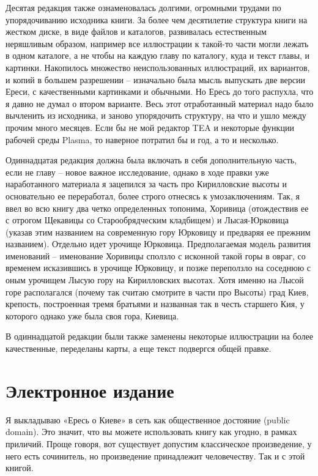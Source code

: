 Десятая редакция также ознаменовалась долгими, огромными трудами по упорядочиванию исходника книги. За более чем десятилетие структура книги на жестком диске, в виде файлов и каталогов, развивалась естественным неряшливым образом, например все иллюстрации к такой-то части могли лежать в одном каталоге, а не чтобы на каждую главу по каталогу, куда и текст главы, и картинки. Накопилось множество неиспользованных иллюстраций, их вариантов, и копий в большем разрешении – изначально была мысль выпускать две версии Ереси, с качественными картинками и обычными. Но Ересь до того распухла, что я давно не думал о втором варианте. Весь этот отработанный материал надо было вычленить из исходника, и заново упорядочить структуру, на что и ушло между прочим много месяцев. Если бы не мой редактор TEA и некоторые функции рабочей среды Plasma, то наверное потратил бы и год, а то и несколько.

Одиннадцатая редакция должна была включать в себя дополнительную часть, если не главу – новое важное исследование, однако в ходе правки уже наработанного материала я зацепился за часть про Кирилловские высоты и основательно ее переработал, более строго отнесясь к умозаключениям. Так, я ввел во всю книгу два четко определенных топонима, Хоривица (отождествив ее с отрогом Щекавицы со Старообрядческим кладбищем) и Лысая-Юрковица (указав этим названием на современную гору Юрковицу и предваряя ее прежним названием). Отдельно идет урочище Юрковица. Предполагаемая модель развития именований – именование Хоривицы сползло с исконной такой горы в овраг, со временем исказившись в урочище Юрковицу, и позже переползло на соседнюю с оным урочищем Лысую гору на Кирилловских высотах. Хотя именно на Лысой горе располагался (почему так считаю смотрите в части про Высоты) град Киев, крепость, построенная тремя братьями и названная так в честь старшего Кия, у которого однако уже была своя гора, Киевица.

В одиннадцатой редакции были также заменены некоторые иллюстрации на более качественные, переделаны карты, а еще текст подвергся общей правке.


\section*{Электронное издание} 

Я выкладываю «Ересь о Киеве» в сеть как общественное достояние (public domain). Это значит, что вы можете использовать книгу как угодно, в рамках приличий. Проще говоря, вот существует допустим классическое произведение, у него есть сочинитель, но произведение принадлежит человечеству. Так и с этой книгой.

